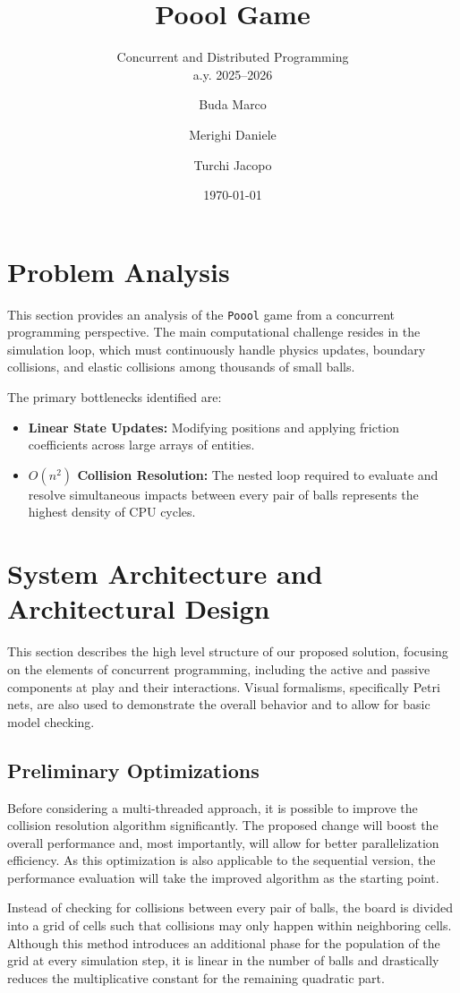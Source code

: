 \documentclass{scrartcl}
\title{\LARGE
  Poool Game
}
\subtitle{Concurrent and Distributed Programming\\a.y. 2025--2026}
\author{
    Buda Marco \and Merighi Daniele \and Turchi Jacopo
}
\date{\today}
\begin{document}
\maketitle

\section{Problem Analysis}

This section provides an analysis of the \texttt{Poool} game from a concurrent programming perspective. The main computational challenge resides in the simulation loop, which must continuously handle physics updates, boundary collisions, and elastic collisions among thousands of small balls.

The primary bottlenecks identified are:
\begin{itemize}
    \item \textbf{Linear State Updates:} Modifying positions and applying friction coefficients across large arrays of entities.
    \item \textbf{$O(n^2)$ Collision Resolution:} The nested loop required to evaluate and resolve simultaneous impacts between every pair of balls represents the highest density of CPU cycles.
\end{itemize}

\section{System Architecture and Architectural Design}
This section describes the high level structure of our proposed solution, focusing on the elements of concurrent programming, including the active and passive components at play and their interactions. Visual formalisms, specifically Petri nets, are also used to demonstrate the overall behavior and to allow for basic model checking.

\subsection{Preliminary Optimizations}
Before considering a multi-threaded approach, it is possible to improve the collision resolution algorithm significantly. The proposed change will boost the overall performance and, most importantly, will allow for better parallelization efficiency. As this optimization is also applicable to the sequential version, the performance evaluation will take the improved algorithm as the starting point.

Instead of checking for collisions between every pair of balls, the board is divided into a grid of cells such that collisions may only happen within neighboring cells. Although this method introduces an additional phase for the population of the grid at every simulation step, it is linear in the number of balls and drastically reduces the multiplicative constant for the remaining quadratic part.
\end{document}

